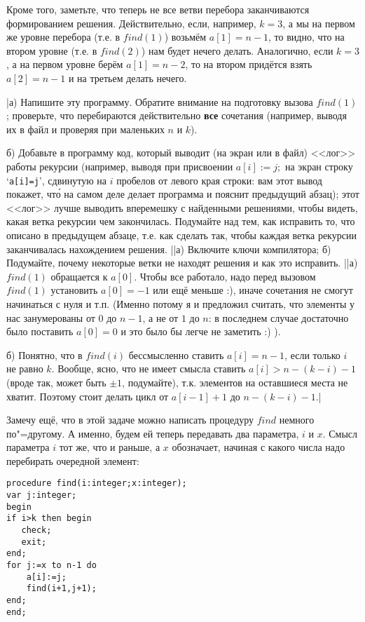 Кроме того, заметьте, что теперь не все ветви перебора заканчиваются 
формированием решения. Действительно, если, например, $k=3$, а мы на первом же 
уровне перебора (т.е. в $find(1)$) возьмём $a[1]=n-1$, то видно, что на втором уровне 
(т.е. в $find(2)$) нам будет нечего делать. Аналогично, если $k=3$, а на первом 
уровне берём $a[1]=n-2$, то на втором придётся взять $a[2]=n-1$ и на третьем делать 
нечего.

\task|а) Напишите эту программу. Обратите внимание на подготовку вызова
   $find(1)$; проверьте, что перебираются действительно \textbf{все} сочетания (например, 
   выводя их в файл и проверяя при маленьких $n$ и $k$). \par
 б) Добавьте в программу код, который выводит (на экран или в файл) <<лог>> работы 
   рекурсии (например, выводя при присвоении $a[i]:=j;$ на экран строку `\texttt{a[i]=j}',
   сдвинутую на $i$ пробелов от левого края строки: вам этот вывод покажет, чт\'{о} на
   самом деле делает программа и пояснит предыдущий абзац); этот <<лог>> лучше
   выводить вперемешку с найденными решениями, чтобы видеть, какая ветка рекурсии
   чем закончилась. Подумайте над тем, как  исправить то, что описано в предыдущем
   абзаце, т.е. как сделать так, чтобы каждая ветка рекурсии заканчивалась нахождением решения.
||а) Включите ключи компилятора; б) Подумайте, почему некоторые ветки не находят решения и как это 
исправить.
||а) $find(1)$ обращается к $a[0]$. Чтобы все работало, надо перед вызовом $find(1)$ установить 
$a[0]=-1$ или ещё меньше :), иначе сочетания не смогут начинаться с нуля и т.п.
(Именно потому я и предложил считать, что элементы у нас занумерованы от $0$ до $n-1$, а не от $1$ 
до $n$: в последнем случае достаточно было поставить $a[0]=0$ и это было бы легче не заметить :) ). 
\par
б) Понятно, что в $find(i)$ бессмысленно ставить $a[i]=n-1$, если только $i$ не равно $k$. Вообще, ясно, 
что не имеет смысла ставить $a[i]>n-(k-i)-1$ (вроде так, может быть $\pm1$, подумайте), т.к. 
элементов на оставшиеся места не хватит. Поэтому стоит делать цикл от $a[i-1]+1$ до $n-(k-i)-1$.|

Замечу ещё, что в этой задаче можно написать процедуру $find$ немного по"=другому. 
А именно, будем ей теперь передавать два параметра, $i$ и $x$. Смысл параметра $i$ 
тот же, что и раньше, а $x$ обозначает, начиная с какого числа надо перебирать 
очередной элемент:

\begin{codesampleo}\begin{verbatim}
procedure find(i:integer;x:integer);
var j:integer;
begin
if i>k then begin
   check;
   exit;
end;
for j:=x to n-1 do
    a[i]:=j;
    find(i+1,j+1);
end;
end;
\end{verbatim}\end{codesampleo}

